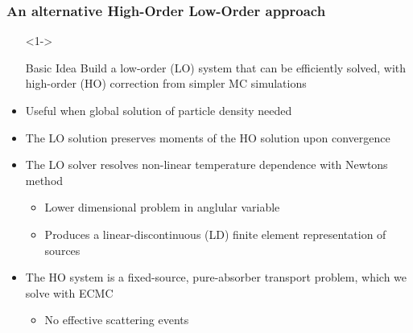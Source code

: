 \documentclass[xcolor=dvipsnames,handout,hyperref={pdfpagelabels=false}]{beamer}
\newcommand{\colb}[1]{{\color{blue} #1}}
\newlength{\wideitemsep}
\let\olditem\item
\renewcommand{\item}{\setlength{\itemsep}{\wideitemsep}\olditem}
\begin{document}
\begin{frame}
    \frametitle{An alternative  High-Order Low-Order approach}
    {\small
        \begin{itemize}
            \item[]<1-> \begin{block}{Basic Idea} Build a low-order (LO) system that can be efficiently solved,
                with high-order (HO) correction from simpler MC simulations \end{block}
                \vspace{-0.321in}
              \item Useful when global solution of particle density needed
              \item<1-> The LO solution preserves moments of the HO solution upon
                  convergence
              \item<2-> The LO solver resolves non-linear temperature dependence with
                  Newtons method
                \begin{itemize}
                    \item<2-> \colb{Lower dimensional} problem in anglular variable
                    \item<2-> Produces a linear-discontinuous (LD) finite element  representation of sources
                \end{itemize}
            \item<3-> The HO system is a fixed-source, pure-absorber transport
                problem, which we solve with ECMC
                \begin{itemize}
                    \item No effective scattering events
                \end{itemize}
        \end{itemize}
    }
\end{frame}
\end{document}
